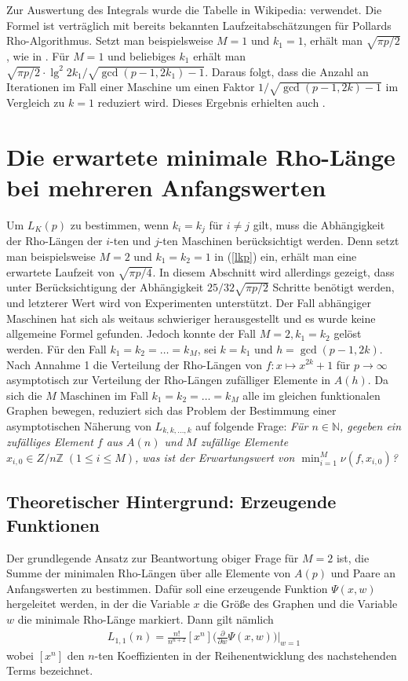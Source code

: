 \documentclass[a4paper, 10pt, ngerman]{article}
\newcommand{\N}{\mathbb{N}}
\newcommand{\Z}{\mathbb{Z}}
\begin{document}
Zur Auswertung des Integrals wurde die Tabelle in Wikipedia: \cite{gint} verwendet. Die Formel ist verträglich mit bereits bekannten Laufzeitabschätzungen für Pollards Rho-Algorithmus. Setzt man beispielsweise $M = 1$ und $k_1 = 1$, erhält man $\sqrt{\pi p / 2}$, wie in \cite{pol75}. Für $M = 1$ und beliebiges $k_1$ erhält man $\sqrt{\pi p / 2} \cdot \lg^2 2k_1 / \sqrt{\gcd(p-1, 2k_1) - 1}$. Daraus folgt, dass die Anzahl an Iterationen im Fall einer Maschine um einen Faktor $1/\sqrt{\gcd(p - 1, 2k) - 1}$ im Vergleich zu $k = 1$ reduziert wird. Dieses Ergebnis erhielten auch \cite{bp81}.

\section{Die erwartete minimale Rho-Länge bei mehreren Anfangswerten}

Um $L_K(p)$ zu bestimmen, wenn $k_i = k_j$ für $i \ne j$ gilt, muss die Abhängigkeit der Rho-Längen der $i$-ten und $j$-ten Maschinen berücksichtigt werden. Denn setzt man beispielsweise $M = 2$ und $k_1 = k_2 = 1$ in (\ref{lkp}) ein, erhält man eine erwartete Laufzeit von $\sqrt {\pi p / 4}$. In diesem Abschnitt wird allerdings gezeigt, dass unter Berücksichtigung der Abhängigkeit $25/32 \sqrt{\pi p / 2}$ Schritte benötigt werden, und letzterer Wert wird von Experimenten unterstützt. Der Fall abhängiger Maschinen hat sich als weitaus schwieriger herausgestellt und es wurde keine allgemeine Formel gefunden. Jedoch konnte der Fall $M = 2, k_1 = k_2$ gelöst werden. Für den Fall $k_1 = k_2 = \dots = k_M$, sei $k = k_1$ und $h = \gcd(p - 1, 2k)$. Nach Annahme 1 die Verteilung der Rho-Längen von $f : x \mapsto x^{2k} + 1$ für $p \to \infty$ asymptotisch zur Verteilung der Rho-Längen zufälliger Elemente in $A(h)$. Da sich die $M$ Maschinen im Fall $k_1 = k_2 = \dots = k_M$ alle im gleichen funktionalen Graphen bewegen, reduziert sich das Problem der Bestimmung einer asymptotischen Näherung von $L_{k, k, \dots, k}$ auf folgende Frage: \emph{Für $n \in \N$, gegeben ein zufälliges Element $f$ aus $A(n)$ und $M$ zufällige Elemente $x_{i, 0} \in Z/n\Z \; (1 \le i \le M)$, was ist der Erwartungswert von $\min_{i = 1}^M \nu(f, x_{i, 0})$?}

\subsection{Theoretischer Hintergrund: Erzeugende Funktionen}

Der grundlegende Ansatz zur Beantwortung obiger Frage für $M = 2$ ist, die Summe der minimalen Rho-Längen über alle Elemente von $A(p)$ und Paare an Anfangswerten zu bestimmen. Dafür soll eine erzeugende Funktion $\Psi(x, w)$ hergeleitet werden, in der die Variable $x$ die Größe des Graphen und die Variable $w$ die minimale Rho-Länge markiert. Dann gilt nämlich
\begin{align*}
    L_{1, 1}(n) = \frac {n!}{n^{n + 2}} [x^n] \Bigg (\frac {\partial} {\partial w} \Psi(x, w) \Bigg ) \Bigg \vert_{w = 1}
\end{align*}
wobei $[x^n]$ den $n$-ten Koeffizienten in der Reihenentwicklung des nachstehenden Terms bezeichnet.
\end{document}

